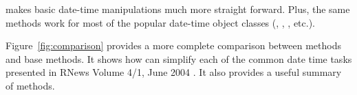 \documentclass[article]{jss}
\begin{document}
 makes basic date-time manipulations much more straight forward. Plus, the same  methods work for most of the popular date-time object classes (, , , etc.).

Figure~\ref{fig:comparison} provides a more complete comparison between  methods and base  methods. It shows how  can simplify each of the common date time tasks presented in RNews Volume 4/1, June 2004 \citep{Rnews}. It also provides a useful summary of  methods.


\end{document}

